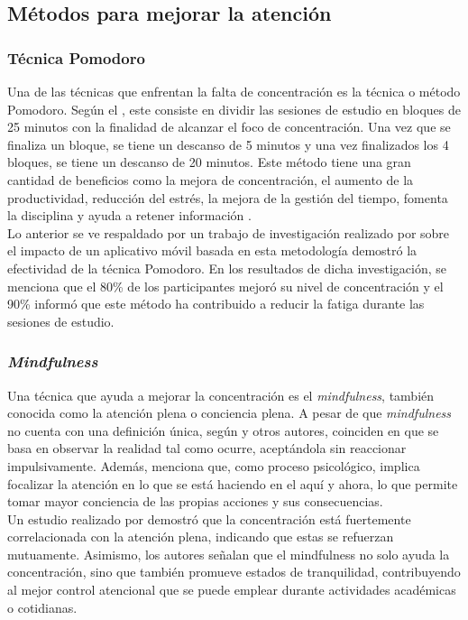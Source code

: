 \subsection{Métodos para mejorar la atención}
\subsubsection{Técnica Pomodoro}
Una de las técnicas que enfrentan la falta de concentración es la técnica o método Pomodoro. Según el \textcite{2.pomodoro1}, este consiste en dividir las sesiones de estudio en bloques de 25 minutos con la finalidad de alcanzar el foco de concentración. Una vez que se finaliza un bloque, se tiene un descanso de 5 minutos y una vez finalizados los 4 bloques, se tiene un descanso de 20 minutos. Este método tiene una gran cantidad de beneficios como la mejora de concentración, el aumento de la productividad, reducción del estrés, la mejora de la gestión del tiempo, fomenta la disciplina y ayuda a retener información \autocite{2.pomodoro2}.\\

Lo anterior se ve respaldado por un trabajo de investigación realizado por \textcite{2.pomodoro3} sobre el impacto de un aplicativo móvil basada en esta metodología demostró la efectividad de la técnica Pomodoro. En los resultados de dicha investigación, se menciona que el 80\% de los participantes mejoró su nivel de concentración y el 90\% informó que este método ha contribuido a reducir la fatiga durante las sesiones de estudio.

\subsubsection{\textit{Mindfulness}}
Una técnica que ayuda a mejorar la concentración es el \textit{mindfulness}, también conocida como la atención plena o conciencia plena. A pesar de que \textit{mindfulness} no cuenta con una definición única, según  \textcite{2.mindfulness1} y otros autores, coinciden en que se basa en observar la realidad tal como ocurre, aceptándola sin reaccionar impulsivamente. Además, menciona que, como proceso psicológico, implica focalizar la atención en lo que se está haciendo en el aquí y ahora, lo que permite tomar mayor conciencia de las propias acciones y sus consecuencias.\\

Un estudio realizado por \textcite{2.mindfulness2} demostró que la concentración está fuertemente correlacionada con la atención plena, indicando que estas se refuerzan mutuamente. Asimismo, los autores señalan que el mindfulness no solo ayuda la concentración, sino que también promueve estados de tranquilidad, contribuyendo al mejor control atencional que se puede emplear durante actividades académicas o cotidianas.

